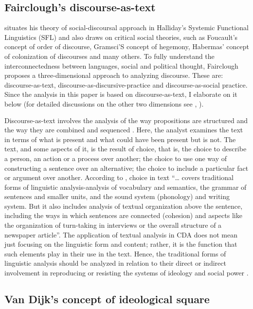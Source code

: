 \documentclass[output=paper,modfonts]{langscibook}
\begin{document}
\subsection{Fairclough’s discourse-as-text}\label{sec:ofori:2.1}

\citeauthor{Fairclough1995} situates his theory of social-discoursal approach in Halliday’s Systemic Functional Linguistics (SFL) and also draws on critical social theories, such as Foucault’s concept of order of discourse, Gramsci'S concept of hegemony, Habermas’ concept of colonization of discourses and many others. To fully understand the interconnectedness between languages, social and political thought, Fairclough proposes a three-dimensional approach to analyzing discourse. These are: discourse-as-text, discourse-as-discursive-practice and discourse-as-social practice. Since the analysis in this paper is based on discourse-as-text, I elaborate on it below (for detailed discussions on the other two dimensions see \citealt{Fairclough1989}, \citeyear{Fairclough1995}).

Discourse-as-text involves the analysis of the way propositions are structured and the way they are combined and sequenced \citep{Fairclough1995}. Here, the analyst examines the text in terms of what is present and what could have been present but is not. The text, and some aspects of it, is the result of choice, that is, the choice to describe a person, an action or a process over another; the choice to use one way of constructing a sentence over an alternative; the choice to include a particular fact or argument over another. According to \citet[57]{Fairclough1995}, choice in text “… covers traditional forms of linguistic analysis-analysis of vocabulary and semantics, the grammar of sentences and smaller units, and the sound system (phonology) and writing system. But it also includes analysis of textual organization above the sentence, including the ways in which sentences are connected (cohesion) and aspects like the organization of turn-taking in interviews or the overall structure of a newspaper article”. The application of textual analysis in CDA does not mean just focusing on the linguistic form and content; rather, it is the function that such elements play in their use in the text. Hence, the traditional forms of linguistic analysis should be analyzed in relation to their direct or indirect involvement in reproducing or resisting the systems of ideology and social power \citep{Richardson2007}.

\subsection{Van Dijk’s concept of ideological square}\label{sec:ofori:2.2}
\end{document}
